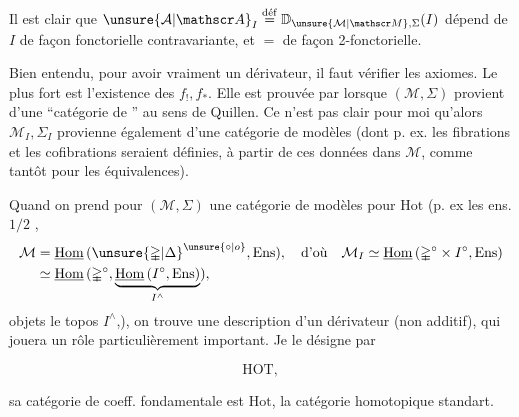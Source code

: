 
Il est clair que $\unsure{\mathcal A|\mathscr A}_{I}\overset{\mathrm{d\acute ef}}{=}\mathbb D_{\unsure{\mathcal M|\mathscr M},\Sigma}(I)$ dépend de $I$ de façon fonctorielle contravariante, et $=$ de façon 2-fonctorielle.

Bien entendu, pour avoir vraiment un dérivateur, il faut vérifier les axiomes. Le plus fort est l'existence des $f_{!},f_{*}$. Elle est prouvée par \uline{} lorsque $(\mathcal M,\Sigma)$ provient d'une ``catégorie de '' au sens de Quillen. Ce n'est pas clair pour moi qu'alors $\mathcal M_{I},\Sigma_{I}$ provienne également d'une catégorie de modèles (dont p. ex. les fibrations et les cofibrations seraient définies, à partir de ces données dans $\mathcal M$, comme tantôt pour les équivalences).

Quand on prend pour $(\mathcal M,\Sigma)$ une catégorie de modèles pour $\mathrm{Hot}$ (p. ex les ens. $1/2$ , \[
\begin{aligned}
\mathcal M&=\underline{\mathrm{Hom}}\,(\unsure{\mathbb{\Delta}|\Delta}^{\unsure{\circ|o}},\mathrm{Ens}),\quad\text{d'où}\quad\mathcal M_{I}\simeq\underline{\mathrm{Hom}}\,(\mathbb{\Delta}^{\circ}\times I^{\circ},\mathrm{Ens})\\
&\simeq\underline{\mathrm{Hom}}\,(\mathbb{\Delta}^{\circ},\underbrace{\underline{\mathrm{Hom}}\,(I^{\circ},\mathrm{Ens})}_{I^{\wedge}}),
\end{aligned}
\]  objets   le topos $I^{\wedge}$,), on trouve une description d'un dérivateur (non additif), qui jouera un rôle particulièrement important. Je le désigne par

\[
\mathrm{HOT},
\]

sa catégorie de coeff. fondamentale est $\mathrm{Hot}$, la catégorie homotopique standart.


